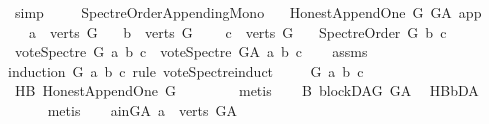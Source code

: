 \begin{isabellebody}
\ simp\ \isanewline
\ \ \isamarkupfalse%
\isanewline
{}\isamarkupfalse%
%
\endisatagproof
{\isafoldproof}%
%
\isadelimproof
\isanewline
%
\endisadelimproof
\isanewline
{}\isamarkupfalse%
\ Spectre{\isacharunderscore}{\kern0pt}Order{\isacharunderscore}{\kern0pt}Appending{\isacharunderscore}{\kern0pt}Mono{\isacharcolon}{\kern0pt}\isanewline
\ \ \ {\isachardoublequoteopen}Honest{\isacharunderscore}{\kern0pt}Append{\isacharunderscore}{\kern0pt}One\ G\ G{\isacharunderscore}{\kern0pt}A\ app{\isachardoublequoteclose}\isanewline
\ \ \ {\isachardoublequoteopen}a\ {\isasymin}\ verts\ G{\isachardoublequoteclose}\isanewline
\ \ \ {\isachardoublequoteopen}b\ {\isasymin}\ verts\ G{\isachardoublequoteclose}\ \isanewline
\ \ \ {\isachardoublequoteopen}c\ {\isasymin}\ verts\ G{\isachardoublequoteclose}\isanewline
\ \ \ {\isachardoublequoteopen}Spectre{\isacharunderscore}{\kern0pt}Order\ G\ b\ c{\isachardoublequoteclose}\isanewline
{}\ {\isachardoublequoteopen}vote{\isacharunderscore}{\kern0pt}Spectre\ G\ a\ b\ c\ {\isasymle}\ vote{\isacharunderscore}{\kern0pt}Spectre\ G{\isacharunderscore}{\kern0pt}A\ a\ b\ c{\isachardoublequoteclose}\isanewline
%
\isadelimproof
\ \ %
\endisadelimproof
%
\isatagproof
{}\isamarkupfalse%
\ assms\isanewline
{}\isamarkupfalse%
{\isacharparenleft}{\kern0pt}induction\ G\ a\ b\ c\ rule{\isacharcolon}{\kern0pt}\ vote{\isacharunderscore}{\kern0pt}Spectre{\isachardot}{\kern0pt}induct{\isacharparenright}{\kern0pt}\isanewline
\ \ \isamarkupfalse%
\ {\isacharparenleft}{\kern0pt}{}\ G\ a\ b\ c{\isacharparenright}{\kern0pt}\isanewline
\ \ \isamarkupfalse%
\ HB{}{\isacharcolon}{\kern0pt}\ Honest{\isacharunderscore}{\kern0pt}Append{\isacharunderscore}{\kern0pt}One\ {\isachardoublequoteopen}G{\isachardoublequoteclose}\ \isamarkupfalse%
\ {}{\isacharparenleft}{\kern0pt}{}{\isacharparenright}{\kern0pt}\isanewline
\ \ \ \ \isamarkupfalse%
\ metis\isanewline
\ \ \isamarkupfalse%
\ B{}{\isacharcolon}{\kern0pt}\ blockDAG\ {\isachardoublequoteopen}G{\isacharunderscore}{\kern0pt}A{\isachardoublequoteclose}\ \isamarkupfalse%
\ HB{}{\isachardot}{\kern0pt}bD{\isacharunderscore}{\kern0pt}A\ \isanewline
\ \ \ \ \isamarkupfalse%
\ metis\isanewline
\ \ \isamarkupfalse%
\ a{\isacharunderscore}{\kern0pt}in{\isacharunderscore}{\kern0pt}G{\isacharunderscore}{\kern0pt}A{\isacharcolon}{\kern0pt}\ {\isachardoublequoteopen}a\ {\isasymin}\ verts\ G{\isacharunderscore}{\kern0pt}A{\isachardoublequoteclose}\ \isamarkupfalse%

\end{isabellebody}

